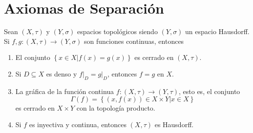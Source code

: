 \documentclass[12pt]{report}
\theoremstyle{largebreak}
\newcommand\cf[3]{\ensuremath{#1:#2\rightarrow#3}}
\begin{document}
    \section{Axiomas de Separación}

    \begin{excer}
        Sean $(X,\tau)$ y $(Y,\sigma)$ espacios topológicos siendo $(Y,\sigma)$ un espacio Hausdorff. Si $\cf{f,g}{(X,\tau)}{(Y,\sigma)}$ son funciones continuas, entonces
        \begin{enumerate}
            \item El conjunto $\left\{x\in X\Big|f(x)=g(x) \right\}$ es cerrado en $(X,\tau)$.
            \item Si $D\subseteq X$ es denso y $f\big|_D=g\big|_D$, entonces $f=g$ en $X$.
            \item La gráfica de la función continua $\cf{f}{(X,\tau)}{(Y,\tau)}$, esto es, el conjunto
            \begin{equation*}
                \Gamma(f)=\left\{(x,f(x))\in X\times Y \Big|x\in X \right\}
            \end{equation*}
            es cerrado en $X\times Y$ con la topología producto.
            \item Si $f$ es inyectiva y continua, entonces $(X,\tau)$ es Hausdorff.
        \end{enumerate}
    \end{excer}
\end{document}
